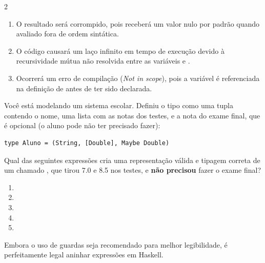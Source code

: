 \documentclass[a4paper,10pt,brazil]{article}
\begin{document}
\begin{multicols}{2}
\begin{enumerate}
  \item O resultado será corrompido, pois  receberá um valor nulo por padrão quando avaliado fora de ordem sintática.

  \item O código causará um laço infinito em tempo de execução devido à recursividade mútua não resolvida entre as variáveis  e .

  \item Ocorrerá um erro de compilação (\emph{Not in scope}), pois a variável  é referenciada na definição de  antes de ter sido declarada.


\end{enumerate}

Você está modelando um sistema escolar. Definiu o tipo  como uma tupla contendo o nome, uma lista com as notas dos testes, e a nota do exame final, que é opcional (o aluno pode não ter precisado fazer):
\begin{verbatim}
type Aluno = (String, [Double], Maybe Double)
\end{verbatim}

Qual das seguintes expressões cria uma representação válida e tipagem correta de um  chamado , que tirou 7.0 e 8.5 nos testes, e \textbf{não precisou} fazer o exame final?

\begin{enumerate}
  \item {}

  \item {}

  \item {}

  \item {}

  \item {}


\end{enumerate}

Embora o uso de guardas seja recomendado para melhor legibilidade, é perfeitamente legal aninhar expressões  em Haskell. 


\end{multicols}
\end{document}
